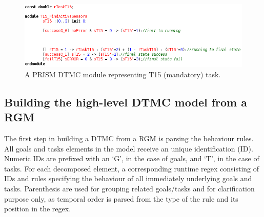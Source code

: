 \begin{figure}[ht]
\centering
\includegraphics[width=1\textwidth]{imgs/PRISM_TSK_MODULE.png}
\caption{A PRISM DTMC module representing T15 (mandatory) task.}
\label{fig:PRISM_TSK_MODULE}
\end{figure}




\subsection{Building the high-level DTMC model from a RGM}


The first step in building a DTMC from a RGM is parsing the behaviour rules. All goals and tasks elements in the model receive an unique identification (ID). Numeric IDs are prefixed with an `G', in the case of goals, and `T', in the case of tasks. For each decomposed element, a corresponding runtime regex consisting of IDs and rules specifying the behaviour of all immediately underlying goals and tasks. Parenthesis are used for grouping related goals/tasks and for clarification purpose only, as temporal order is parsed from the type of the rule and its position in the regex.


